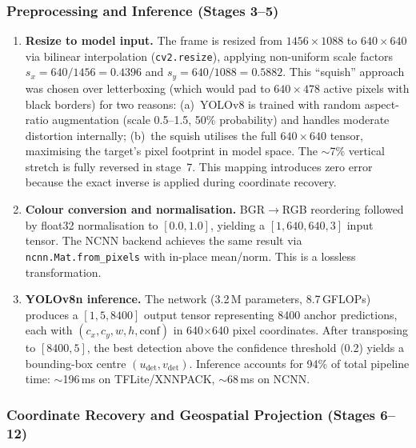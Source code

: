 \documentclass[10pt,a4paper]{article}
\begin{document}
\subsubsection{Preprocessing and Inference (Stages 3--5)}

\begin{enumerate}[resume]
  \item \textbf{Resize to model input.} The frame is resized from $1456 \times 1088$ to $640 \times 640$ via bilinear interpolation (\texttt{cv2.resize}), applying non-uniform scale factors $s_x = 640/1456 = 0.4396$ and $s_y = 640/1088 = 0.5882$.  This ``squish'' approach was chosen over letterboxing (which would pad to $640 \times 478$ active pixels with black borders) for two reasons: (a)~YOLOv8 is trained with random aspect-ratio augmentation (scale 0.5--1.5, 50\% probability) and handles moderate distortion internally; (b)~the squish utilises the full $640 \times 640$ tensor, maximising the target's pixel footprint in model space.  The ${\sim}$7\% vertical stretch is fully reversed in stage~7.  This mapping introduces zero error because the exact inverse is applied during coordinate recovery.

  \item \textbf{Colour conversion and normalisation.} BGR$\to$RGB reordering followed by float32 normalisation to $[0.0, 1.0]$, yielding a $[1, 640, 640, 3]$ input tensor.  The NCNN backend achieves the same result via \texttt{ncnn.Mat.from\_pixels} with in-place mean/norm.  This is a lossless transformation.

  \item \textbf{YOLOv8n inference.} The network (3.2\,M parameters, 8.7\,GFLOPs) produces a $[1, 5, 8400]$ output tensor representing 8400 anchor predictions, each with $(c_x, c_y, w, h, \text{conf})$ in 640$\times$640 pixel coordinates.  After transposing to $[8400, 5]$, the best detection above the confidence threshold (0.2) yields a bounding-box centre $(u_\mathrm{det}, v_\mathrm{det})$.  Inference accounts for 94\% of total pipeline time: ${\sim}$196\,ms on TFLite/XNNPACK, ${\sim}$68\,ms on NCNN.
\end{enumerate}

\subsubsection{Coordinate Recovery and Geospatial Projection (Stages 6--12)}
\end{document}
